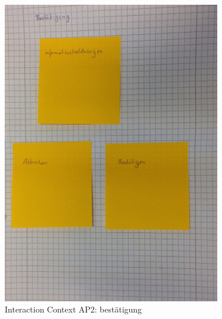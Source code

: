 \begin{figure}[H]
\centering
\includegraphics[angle=90, width=0.85\textwidth]  {./images/abstract/version2/bestaetigung.JPG}
\caption{Interaction Context AP2: bestätigung}
\label{interfaceContents45}
\end{figure}



